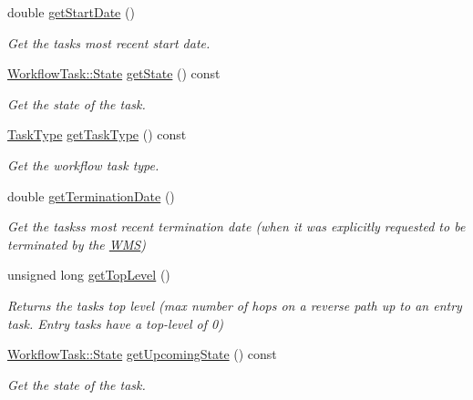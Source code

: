 \begin{DoxyCompactItemize}
double \hyperlink{classwrench_1_1_workflow_task_a17462dd156a6080653f96a1abbbb379d}{get\+Start\+Date} ()
\begin{DoxyCompactList}\small\item\em Get the task\textquotesingle{}s most recent start date. \end{DoxyCompactList}\item 
\hyperlink{classwrench_1_1_workflow_task_a1184f3d7aea21e1c87a9b17e84f1f92a}{Workflow\+Task\+::\+State} \hyperlink{classwrench_1_1_workflow_task_a990a3e96d944c37cb896a7ca0d84a4db}{get\+State} () const
\begin{DoxyCompactList}\small\item\em Get the state of the task. \end{DoxyCompactList}\item 
\hyperlink{classwrench_1_1_workflow_task_a490a935259b9425a3e4fb011a86cb4bf}{Task\+Type} \hyperlink{classwrench_1_1_workflow_task_ac9ad03bc492dd9a827c43e13e079e08c}{get\+Task\+Type} () const
\begin{DoxyCompactList}\small\item\em Get the workflow task type. \end{DoxyCompactList}\item 
double \hyperlink{classwrench_1_1_workflow_task_a864c86e8bb6de6ab16106169ec0a2cc2}{get\+Termination\+Date} ()
\begin{DoxyCompactList}\small\item\em Get the tasks\textquotesingle{}s most recent termination date (when it was explicitly requested to be terminated by the \hyperlink{classwrench_1_1_w_m_s}{W\+MS}) \end{DoxyCompactList}\item 
unsigned long \hyperlink{classwrench_1_1_workflow_task_a07fd9a09e51649fe32aedd22166b1047}{get\+Top\+Level} ()
\begin{DoxyCompactList}\small\item\em Returns the task\textquotesingle{}s top level (max number of hops on a reverse path up to an entry task. Entry tasks have a top-\/level of 0) \end{DoxyCompactList}\item 
\hyperlink{classwrench_1_1_workflow_task_a1184f3d7aea21e1c87a9b17e84f1f92a}{Workflow\+Task\+::\+State} \hyperlink{classwrench_1_1_workflow_task_acb8706e0b3d3d7457300f698cab24ef7}{get\+Upcoming\+State} () const
\begin{DoxyCompactList}\small\item\em Get the state of the task. \end{DoxyCompactList}\item 

\end{DoxyCompactItemize}
